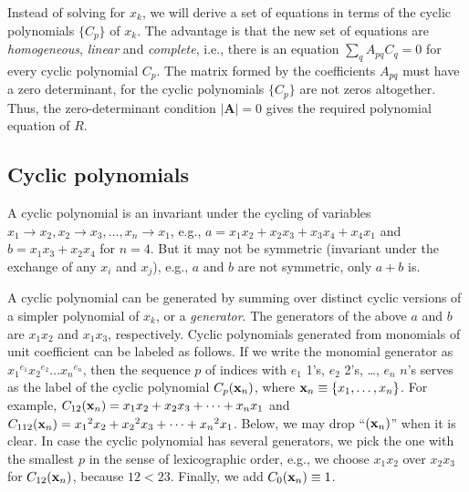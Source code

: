 \documentclass{ws-ijbc}
\begin{document}
Instead of solving  for $x_k$,
  we will derive a set of equations
  in terms of the cyclic polynomials $\{C_p\}$ of $x_k$.
%
The advantage is that the new set of equations are
  \emph{homogeneous}, \emph{linear} and \emph{complete},
  i.e., there is an equation
  $\sum_q A_{pq} C_q = 0$ for every cyclic polynomial $C_p$.
%
The matrix formed by the coefficients $A_{pq}$
  must have a zero determinant,
  for the cyclic polynomials $\{C_p\}$ are not zeros altogether.
%
Thus, the zero-determinant condition $|\mathbf A| = 0$ gives
  the required polynomial equation of $R$.
%


\subsection{\label{sec:cyclic}Cyclic polynomials}


A cyclic polynomial is an invariant
  under the cycling of variables
  $x_1 \rightarrow x_2, x_2 \rightarrow x_3,
  \ldots, x_n \rightarrow x_1$,
  e.g., $a = x_1 x_2 + x_2 x_3 + x_3 x_4 + x_4 x_1$
  and $b = x_1 x_3 + x_2 x_4$ for $n = 4$.
%
But it may not be symmetric
  (invariant under the exchange of any $x_i$ and $x_{j}$),
  e.g., $a$ and $b$ are not symmetric,
  only $a + b$ is.


A cyclic polynomial can be generated by summing over
  distinct cyclic versions of a simpler polynomial of $x_k$, or a \emph{generator}.
The generators of the above $a$ and $b$
  are $x_1 x_2$ and $x_1 x_3$, respectively.
%
%
%
Cyclic polynomials
  generated from monomials of unit coefficient
  can be labeled as follows.
If we write the monomial generator as
  ${x_1}^{e_1} {x_2}^{e_2} \dots {x_n}^{e_n}$,
  then the sequence $p$ of indices with
  $e_1$ 1's, $e_2$ 2's, \ldots, $e_n$ $n$'s
  serves as the label of the cyclic polynomial $C_p(\mathbf{x}_{n})$,
  where $\mathbf{x}_{n} \equiv \{x_1, \ldots, x_n\}$.
%
For example,
$C_{12}(\mathbf{x}_{n})  = x_1 x_2 + x_2 x_3 + \dots + x_n x_1$
and
$C_{112}(\mathbf{x}_{n}) = {x_1}^2 x_2 + {x_2}^2 x_3 + \dots + {x_n}^2 x_1$.
%
Below, we may drop %
  ``$(\mathbf{x}_{n})$'' when it is clear.
In case the cyclic polynomial has several generators,
  we pick the one with the smallest $p$
  in the sense of lexicographic order,
  e.g., we choose $x_1 x_2$ over $x_2 x_3$ for $C_{12}(\mathbf{x}_{n})$,
  because $12 < 23$.
%
Finally, we add $C_0(\mathbf{x}_{n}) \equiv 1$.
%
%
%
\end{document}
